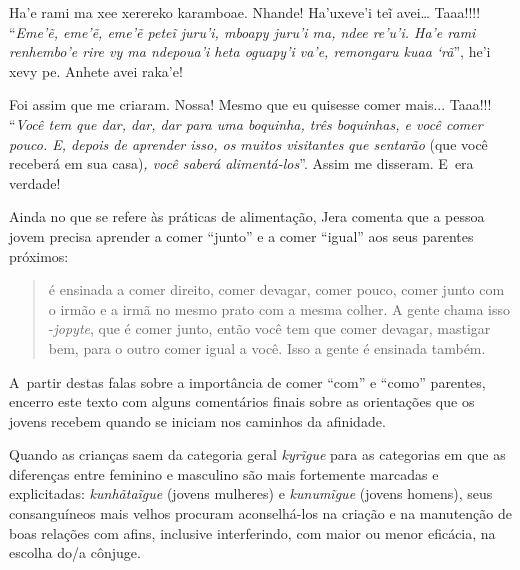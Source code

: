 \begin{paracol}{2}
\switchcolumn
Ha'e rami ma xee xerereko karamboae. Nhande! Ha'uxeve'i teĩ avei\ldots{}
Taaa!!!! ``\emph{Eme'ẽ, eme'ẽ, eme'ẽ peteĩ juru'i, mboapy juru'i ma,
ndee re'u'i. Ha'e rami renhembo'e rire vy ma ndepoua'i heta oguapy'i
va'e, remongaru kuaa `rã}'', he'i xevy pe. Anhete avei raka'e!

\switchcolumn
Foi assim que me criaram. Nossa! Mesmo que eu quisesse comer mais...
Taaa!!! ``\emph{Você tem que dar, dar, dar para uma boquinha, três
boquinhas, e você comer pouco. E, depois de aprender isso, os muitos
visitantes} \emph{que sentarão} (que você receberá em sua casa)\emph{,
você saberá alimentá-los}''. Assim me disseram. E~era verdade!
\end{paracol}

\bigskip

Ainda no que se refere às práticas de alimentação, Jera comenta que a
pessoa jovem precisa aprender a comer ``junto'' e a comer ``igual'' aos seus
parentes próximos:

\begin{quote}
 é ensinada a comer direito, comer devagar, comer pouco,
comer junto com o irmão e a irmã no mesmo prato com a mesma colher. A
gente chama isso -\emph{jopyte}, que é comer junto, então você tem que comer
devagar, mastigar bem, para o outro comer igual a você. Isso a gente é
ensinada também.
\end{quote}

A~partir destas falas sobre a importância de comer ``com'' e ``como'' parentes,
encerro este texto com alguns comentários finais sobre as orientações
que os jovens recebem quando se iniciam nos caminhos da afinidade.

Quando as crianças saem da categoria geral \emph{kyrĩgue} para as categorias
em que as diferenças entre feminino e masculino são mais fortemente
marcadas e explicitadas: \emph{kunhãtaĩgue} (jovens mulheres) e
\emph{kunumĩgue} (jovens homens), seus consanguíneos mais velhos procuram
aconselhá-los na criação e na manutenção de boas relações com afins,
inclusive interferindo, com maior ou menor eficácia, na escolha do/a
cônjuge.

